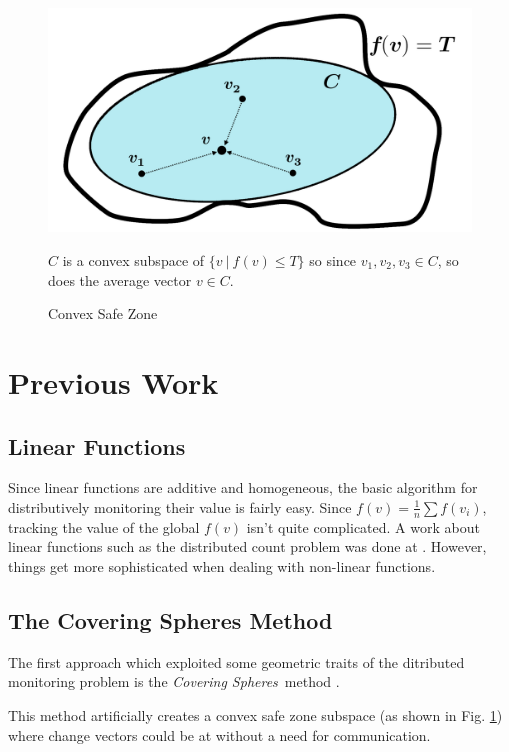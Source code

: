 \documentclass[11pt, conference]{article}
\newcommand{\coveringSpheres}{\textit{Covering Spheres}}
\begin{document}
\begin{figure}[h]
\begin{center}
\includegraphics[width=0.6\linewidth]{Pics/PNGs/ConvexSafeZone.png}
\end{center}
\caption{Convex Safe Zone}
\label{fig:ConvexSafeZoneSketch}
\medskip
\small
\begin{center}
$C$ is a convex subspace of ${\{v \ | \ f(v) \leq T\}}$ so since ${v_1,v_2,v_3 \in C}$, so does the average vector $v \in C$.
\end{center}
\end{figure}

\section{Previous Work}

\subsection{Linear Functions}

Since linear functions are additive and homogeneous, the basic algorithm for distributively monitoring their value is fairly easy. Since ${f(v) = \frac{1}{n}\sum f(v_i)}$, tracking the value of the global $f(v)$ isn't quite complicated. A work about linear functions such as the distributed count problem was done at \cite{keralapura2006communication}. However, things get more sophisticated when dealing with non-linear functions.

\subsection{The Covering Spheres Method}

The first approach which exploited some geometric traits of the ditributed monitoring problem is the \coveringSpheres \ method \cite{sharfman2007geometric}.

This method artificially creates a convex safe zone subspace (as shown in Fig. \ref{fig:ConvexSafeZoneSketch}) where change vectors could be at without a need for communication.
\end{document}
